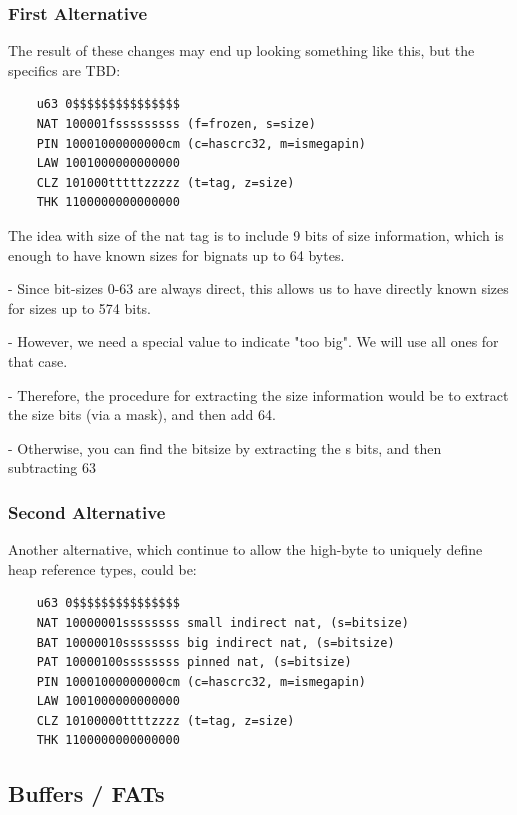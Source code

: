 \subsubsection{First Alternative}

The result of these changes may end up looking something like this,
but the specifics are TBD:

\begin{verbatim}
    u63 0$$$$$$$$$$$$$$$
    NAT 100001fsssssssss (f=frozen, s=size)
    PIN 10001000000000cm (c=hascrc32, m=ismegapin)
    LAW 1001000000000000
    CLZ 101000tttttzzzzz (t=tag, z=size)
    THK 1100000000000000
\end{verbatim}

The idea with size of the nat tag is to include 9 bits of size
information, which is enough to have known sizes for bignats up to
64 bytes.

-   Since bit-sizes 0-63 are always direct, this allows us to have
    directly known sizes for sizes up to 574 bits.

-   However, we need a special value to indicate "too big".  We will
    use all ones for that case.

-   Therefore, the procedure for extracting the size information would be
    to extract the size bits (via a mask), and then add 64.

-   Otherwise, you can find the bitsize by extracting the s bits, and
    then subtracting 63

\subsubsection{Second Alternative}

Another alternative, which continue to allow the high-byte to uniquely
define heap reference types, could be:

\begin{verbatim}
    u63 0$$$$$$$$$$$$$$$
    NAT 10000001ssssssss small indirect nat, (s=bitsize)
    BAT 10000010ssssssss big indirect nat, (s=bitsize)
    PAT 10000100ssssssss pinned nat, (s=bitsize)
    PIN 10001000000000cm (c=hascrc32, m=ismegapin)
    LAW 1001000000000000
    CLZ 10100000ttttzzzz (t=tag, z=size)
    THK 1100000000000000
\end{verbatim}


\subsection{Buffers / FATs}

